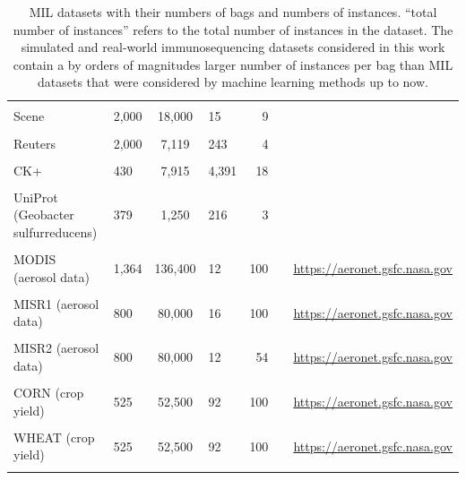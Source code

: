 \documentclass[oneside]{book}
\begin{document}
\begin{table}[htbp]
\begin{center}
{\begin{varwidth}{\textheight}
\begin{center}
{\begin{tabular}{lacarac}
             & &  & & & & \\
            Scene & 2,000 & 18,000 & 15 & 9 & \citet{ruiz2018knnmiml} & \citet{zhang2007multi}\\
             & &  & & & & \\
            Reuters & 2,000 & 7,119 & 243 & 4 & \citet{ruiz2018knnmiml} & \citet{sebastiani2002machine}\\
             & &  & & & & \\
            CK+ & 430 & 7,915 & 4,391 & 18 & \citet{ruiz2018knnmiml} & \citet{lucey2010extended}\\
             & &  & & & & \\
            UniProt (Geobacter sulfurreducens) & 379 & 1,250 & 216 & 3 & \citet{ruiz2018knnmiml} & \citet{wu2014genome}\\
             & &  & & & & \\
            MODIS (aerosol data) & 1,364 & 136,400 & 12 & 100 & \citet{uriot2019learning} & \url{https://aeronet.gsfc.nasa.gov}\\
             & &  & & & & \\
            MISR1 (aerosol data) & 800 & 80,000 & 16 & 100 & \citet{uriot2019learning} & \url{https://aeronet.gsfc.nasa.gov}\\
             & &  & & & & \\
            MISR2 (aerosol data) & 800 & 80,000 & 12 & 54 & \citet{uriot2019learning} & \url{https://aeronet.gsfc.nasa.gov}\\
             & &  & & & & \\
            CORN (crop yield) & 525 & 52,500 & 92 & 100 & \citet{uriot2019learning} & \url{https://aeronet.gsfc.nasa.gov}\\
             & &  & & & & \\
            WHEAT (crop yield) & 525 & 52,500 & 92 & 100 & \citet{uriot2019learning} & \url{https://aeronet.gsfc.nasa.gov}\\
             & &  & & & & \\
            \bottomrule
        \end{tabular}%
        }
        \parbox{0.87\textheight}{\caption[Overview of MIL datasets and their characteristics]{MIL datasets with their numbers of bags and numbers of instances. ``total number of instances'' refers to the total number of instances in the dataset.
        The simulated and real-world immunosequencing datasets considered in this work contain a by orders of magnitudes larger number of instances per bag than MIL datasets that were considered by machine learning methods up to now.}%
        \label{tab:mil_datasets}}%
    \end{center}%
    \end{varwidth}%
    }%
    \end{center}%
\end{table}
\end{document}
